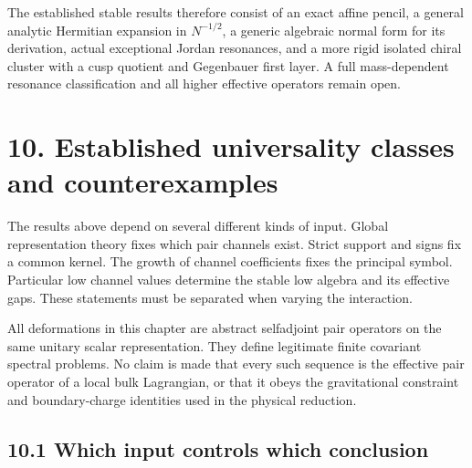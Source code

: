 The established stable results therefore consist of an exact affine pencil, a general analytic Hermitian expansion in \(N^{-1/2}\), a generic algebraic normal form for its derivation, actual exceptional Jordan resonances, and a more rigid isolated chiral cluster with a cusp quotient and Gegenbauer first layer. A full mass-dependent resonance classification and all higher effective operators remain open.

\clearpage
\hypertarget{established-universality-classes-and-counterexamples}{%
\section{10. Established universality classes and counterexamples}\label{established-universality-classes-and-counterexamples}}

The results above depend on several different kinds of input. Global representation theory fixes which pair channels exist. Strict support and signs fix a common kernel. The growth of channel coefficients fixes the principal symbol. Particular low channel values determine the stable low algebra and its effective gaps. These statements must be separated when varying the interaction.

All deformations in this chapter are abstract selfadjoint pair operators on the same unitary scalar representation. They define legitimate finite covariant spectral problems. No claim is made that every such sequence is the effective pair operator of a local bulk Lagrangian, or that it obeys the gravitational constraint and boundary-charge identities used in the physical reduction.

\hypertarget{which-input-controls-which-conclusion}{%
\subsection{10.1 Which input controls which conclusion}\label{which-input-controls-which-conclusion}}

